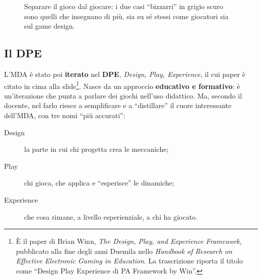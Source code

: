 \begin{figure}[htbp]
\centering
{}
\caption{Separare il gioco dal giocare: i due casi ``bizzarri'' in grigio scuro
sono quelli che insegnano di più, sia su sé stessi come giocatori sia sul game
design.}
\label{a3:fig:gameplay}
\end{figure}

\subsection{Il DPE}



L'MDA è stato poi \textbf{iterato} nel \textbf{DPE}, \emph{Design, Play,
Experience}, il cui paper è citato in cima alla slide\footnote{È il paper di
Brian Winn, \emph{The Design, Play, and Experience Framework}, pubblicato alla fine degli anni Duemila nello \emph{Handbook of Research on Effective Electronic Gaming in
Education}. La trascrizione riporta il titolo come ``Design Play Experience di
PA Framework by Win''.}. Nasce da un approccio \textbf{educativo e formativo}:
è un'iterazione che punta a parlare dei giochi nell'uso didattico. Ma, secondo
il docente, nel farlo riesce a semplificare e a ``distillare'' il cuore
interessante dell'MDA, con tre nomi ``più accurati'':
\begin{description}
  \item[Design] la parte in cui chi progetta crea le meccaniche;
  \item[Play] chi gioca, che applica e ``esperisce'' le dinamiche;
  \item[Experience] che cosa rimane, a livello esperienziale, a chi ha giocato.
\end{description}


